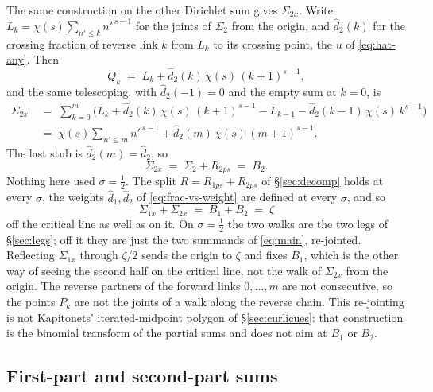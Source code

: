 \documentclass[11pt]{article}
\theoremstyle{definition}
\begin{document}
The same construction on the other Dirichlet sum gives \(\Sigma_{2x}\). Write
\(L_k=\chi(s)\sum_{n'\le k}n'^{\,s-1}\) for the joints of \(\Sigma_2\) from
the origin, and \(\hat d_2(k)\) for the crossing fraction of reverse
link \(k\) from \(L_k\) to its crossing point, the \(u\) of \eqref{eq:hat-any}. Then
\begin{equation}\label{eq:sum-2x-point}
Q_k
\;=\;
L_k+\hat d_2(k)\,\chi(s)\,(k+1)^{s-1},
\end{equation}
and the same telescoping, with \(\hat d_2(-1)=0\) and the empty sum at \(k=0\), is
\begin{equation}\label{eq:sum-2x}
\begin{aligned}
\Sigma_{2x}
&\;=\;
\sum_{k=0}^{m}\Biggl(
L_k+\hat d_2(k)\,\chi(s)\,(k+1)^{s-1}
-L_{k-1}-\hat d_2(k-1)\,\chi(s)\,k^{s-1}
\Biggr)\\
&\;=\;
\chi(s)\sum_{n'\le m}n'^{\,s-1}+\hat d_2(m)\,\chi(s)\,(m+1)^{s-1}.
\end{aligned}
\end{equation}
The last stub is \(\hat d_2(m)=\hat d_2\), so
\begin{equation}\label{eq:sum-2x-B2}
\Sigma_{2x}
\;=\;
\Sigma_2+R_{2ps}
\;=\;
B_2.
\end{equation}
Nothing here used \(\sigma=\tfrac12\). The split
\(R=R_{1ps}+R_{2ps}\) of \S\ref{sec:decomp} holds at every \(\sigma\), the
weights \(\hat d_1,\hat d_2\) of \eqref{eq:frac-vs-weight} are defined at
every \(\sigma\), and so
\begin{equation}\label{eq:sum-x-zeta}
\Sigma_{1x}+\Sigma_{2x}
\;=\;
B_1+B_2
\;=\;
\zeta
\end{equation}
off the critical line as well as on it. On \(\sigma=\tfrac12\) the two walks
are the two legs of \S\ref{sec:legs}; off it they are just the two summands
of \eqref{eq:main}, re-jointed. Reflecting \(\Sigma_{1x}\) through
\(\zeta/2\) sends the origin to \(\zeta\) and fixes \(B_1\), which is the
other way of seeing the second half on the critical line, not the walk of
\(\Sigma_{2x}\) from the origin. The reverse partners of the forward links
\(0,\dots,m\) are not consecutive, so the points \(P_k\) are not the joints
of a walk along the reverse chain. This re-jointing is not Kapitonets'
iterated-midpoint polygon of \S\ref{sec:curlicues}: that construction is the
binomial transform of the partial sums and does not aim at \(B_1\) or
\(B_2\).

\subsection{First-part and second-part sums}\label{sec:half-link-sums}
\end{document}
